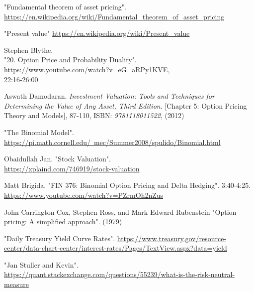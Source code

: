 \documentclass[12pt, letterpaper]{article}\usepackage{float}
\begin{document}
\begin{thebibliography}{9}
    "Fundamental theorem of asset pricing". \\
    \href{https://en.wikipedia.org/wiki/Fundamental\_theorem\_of\_asset\_pricing}{https://en.wikipedia.org/wiki/Fundamental\_theorem\_of\_asset\_pricing}

    "Present value"
    \href{https://en.wikipedia.org/wiki/Present\_value}{https://en.wikipedia.org/wiki/Present\_value}

    Stephen Blythe. \\
    "20. Option Price and Probability Duality". \\
    \href{https://www.youtube.com/watch?v=eG\_aRPy1KVE}{https://www.youtube.com/watch?v=eG\_aRPy1KVE}, \\
    22:16-26:00
  
    Aswath Damodaran.
    \textit{Investment Valuation: Tools and Techniques for Determining the Value of Any Asset, Third Edition}.
    [Chapter 5: Option Pricing Theory and Models], 87-110,
    ISBN: \textit{9781118011522},
    (2012)

    "The Binomial Model".
    \href{https://pi.math.cornell.edu/~mec/Summer2008/spulido/Binomial.html}{https://pi.math.cornell.edu/~mec/Summer2008/spulido/Binomial.html}

    Obaidullah Jan.
    "Stock Valuation".
    \\
    \href{https://xplaind.com/746919/stock-valuation}{https://xplaind.com/746919/stock-valuation}

    Matt Brigida.
    "FIN 376: Binomial Option Pricing and Delta Hedging".
    3:40-4:25.
    \\
    \href{https://www.youtube.com/watch?v=PZrmOh2nZus}{https://www.youtube.com/watch?v=PZrmOh2nZus}

    John Carrington Cox, Stephen Ross, and Mark Edward Rubenstein
    "Option pricing: A simplified approach".
    (1979)

    "Daily Treasury Yield Curve Rates".
    \href{https://www.treasury.gov/resource-center/data-chart-center/interest-rates/Pages/TextView.aspx?data=yield}{https://www.treasury.gov/resource-center/data-chart-center/interest-rates/Pages/TextView.aspx?data=yield}

    "Jan Stuller and Kevin". \\
    \href{https://quant.stackexchange.com/questions/55239/what-is-the-risk-neutral-measure}{https://quant.stackexchange.com/questions/55239/what-is-the-risk-neutral-measure}


\end{thebibliography}
\end{document}

